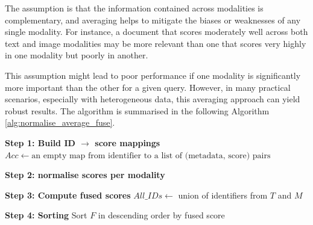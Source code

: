 \documentclass[12pt,twoside]{report}
\begin{document}
The assumption is that the information contained across modalities is complementary, and averaging helps to mitigate the biases or weaknesses of any single modality. For instance, a document that scores moderately well across both text and image modalities may be more relevant than one that scores very highly in one modality but poorly in another.

This assumption might lead to poor performance if one modality is significantly more important than the other for a given query. However, in many practical scenarios, especially with heterogeneous data, this averaging approach can yield robust results. The algorithm is summarised in the following Algorithm \ref{alg:normalise_average_fuse}.

\begin{algorithm}[t!h]
\DontPrintSemicolon
\caption{normalise and Average Scores Across Modalities}
\label{alg:normalise_average_fuse}
\BlankLine

\textbf{Step 1: Build ID $\rightarrow$ score mappings}\;
$Acc \gets \text{an empty map from identifier to a list of (metadata, score) pairs}$\;

\BlankLine
\textbf{Step 2: normalise scores per modality}\;

\BlankLine
\textbf{Step 3: Compute fused scores}\;
$All\_IDs \gets$ union of identifiers from $T$ and $M$\;

\BlankLine
\textbf{Step 4: Sorting}\;
Sort $F$ in descending order by fused score\;

\BlankLine
{}\;
\end{algorithm}
\end{document}
